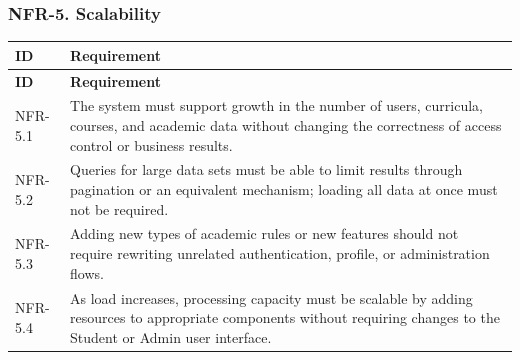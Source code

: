 \subsubsection{NFR-5. Scalability}
\begin{longtable}{|p{}|p{}|}
\hline
\textbf{ID} & \textbf{Requirement} \\
\hline
\endfirsthead
\hline
\textbf{ID} & \textbf{Requirement} \\
\hline
\endhead
NFR-5.1 & The system must support growth in the number of users, curricula, courses, and academic data without changing the correctness of access control or business results. \\
\hline
NFR-5.2 & Queries for large data sets must be able to limit results through pagination or an equivalent mechanism; loading all data at once must not be required. \\
\hline
NFR-5.3 & Adding new types of academic rules or new features should not require rewriting unrelated authentication, profile, or administration flows. \\
\hline
NFR-5.4 & As load increases, processing capacity must be scalable by adding resources to appropriate components without requiring changes to the Student or Admin user interface. \\
\hline
\end{longtable}

